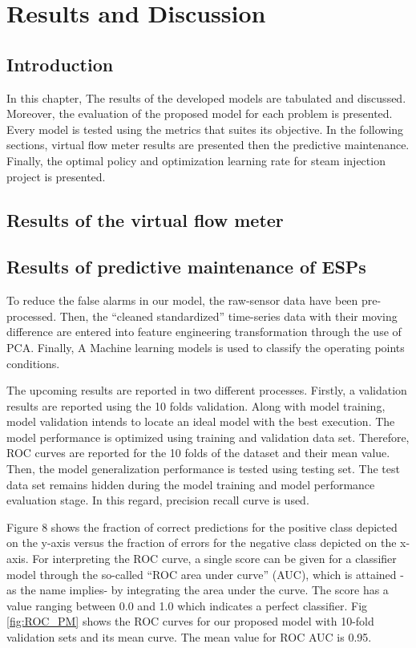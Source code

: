 \chapter{Results and Discussion}

\section{Introduction}
In this chapter, The results of the developed models are tabulated and discussed. Moreover, the evaluation of the proposed model for each problem is presented. Every model is tested using the metrics that suites its objective. In the following sections, virtual flow meter results are presented then the predictive maintenance. Finally, the optimal policy and optimization learning rate for steam injection project is presented. 

\section{Results of the virtual flow meter}

\section{Results of predictive maintenance of ESPs}
To reduce the false alarms in our model, the raw-sensor data have been pre-processed. Then, the “cleaned standardized” time-series data with their moving difference are entered into feature engineering transformation through the use of \ac{PCA}. Finally, A Machine learning models is used to classify the operating points conditions.

The upcoming results are reported in two different processes. Firstly, a validation results are reported using the 10 folds validation. Along with model training, model validation intends to locate an ideal model with the best execution. The model performance is optimized using training and validation data set. Therefore, \ac{ROC} curves are reported for the 10 folds of the dataset and their mean value. Then, the model generalization performance is tested using testing set. The test data set remains hidden during the model training and model performance evaluation stage. In this regard, precision recall curve is used.

Figure 8 shows the fraction of correct predictions for the positive class depicted on the y-axis versus the fraction of errors for the negative class depicted on the x-axis. For interpreting the \ac{ROC} curve, a single score can be given for a classifier model through the so-called “ROC area under curve” (AUC), which is attained -as the name implies- by integrating the area under the curve. The score has a value ranging between 0.0 and 1.0 which indicates a perfect classifier. Fig \ref{fig:ROC_PM} shows the ROC curves for our proposed model with 10-fold validation sets and its mean curve. The mean value for \ac{ROC} AUC is 0.95.

